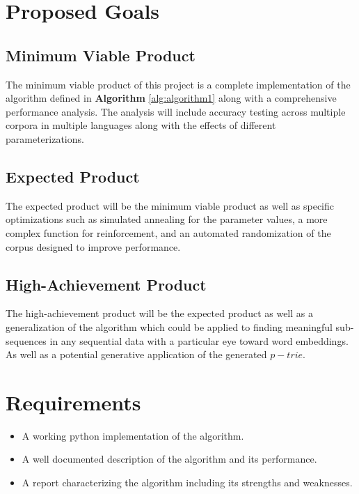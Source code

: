 \documentclass[11pt,a4paper]{article}
\begin{document}
\section{Proposed Goals}
\subsection{Minimum Viable Product}
The minimum viable product of this project is a complete implementation of the
algorithm defined in \textbf{Algorithm} \ref{alg:algorithm1} along with a 
comprehensive performance analysis. The 
analysis will include accuracy testing across multiple corpora in multiple
languages along with the effects of different parameterizations.
\subsection{Expected Product}
The expected product will be the minimum viable product as well as specific 
optimizations such as simulated annealing for the parameter values, a more
complex function for reinforcement, and an automated randomization of the 
corpus designed to improve performance.
\subsection{High-Achievement Product}
The high-achievement product will be the expected product as well as a generalization of the algorithm which could be applied to finding meaningful 
sub-sequences in any sequential data with a particular eye toward word 
embeddings. As well as a potential generative application of the generated 
$p-trie$.
\section{Requirements}
\begin{itemize}
        \item A working python implementation of the algorithm.
        \item A well documented description of the algorithm and its 
                performance.
        \item A report characterizing the algorithm including its strengths 
                and weaknesses.
\end{itemize}
\end{document}
